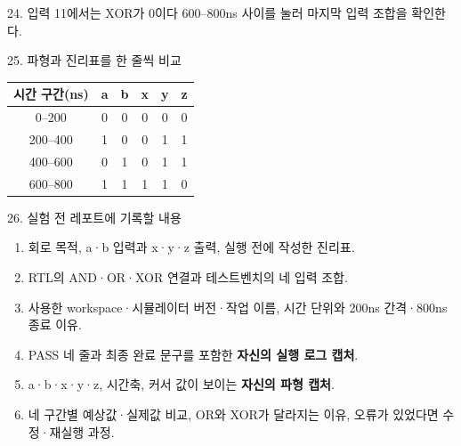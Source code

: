 \begin{frame}{24. 입력 11에서는 XOR가 0이다}
\small 600--800ns 사이를 눌러 마지막 입력 조합을 확인한다.
\end{frame}

\begin{frame}{25. 파형과 진리표를 한 줄씩 비교}
\small\renewcommand{\arraystretch}{1.6}
\begin{center}
\begin{tabular}{c|cc|ccc}
시간 구간(ns) & a & b & x & y & z\\\hline
0--200 & 0 & 0 & 0 & 0 & 0\\
200--400 & 1 & 0 & 0 & 1 & 1\\
400--600 & 0 & 1 & 0 & 1 & 1\\
600--800 & 1 & 1 & 1 & 1 & 0
\end{tabular}
\end{center}
\end{frame}

\begin{frame}[label=vsc01-report]{26. 실험 전 레포트에 기록할 내용}
\small
\begin{enumerate}
\setlength{\itemsep}{0.18cm}
\item 회로 목적, a·b 입력과 x·y·z 출력, 실행 전에 작성한 진리표.
\item RTL의 AND·OR·XOR 연결과 테스트벤치의 네 입력 조합.
\item 사용한 workspace·시뮬레이터 버전·작업 이름, 시간 단위와 200ns 간격·800ns 종료 이유.
\item PASS 네 줄과 최종 완료 문구를 포함한 \textbf{자신의 실행 로그 캡처}.
\item a·b·x·y·z, 시간축, 커서 값이 보이는 \textbf{자신의 파형 캡처}.
\item 네 구간별 예상값·실제값 비교, OR와 XOR가 달라지는 이유, 오류가 있었다면 수정·재실행 과정.
\end{enumerate}
\end{frame}

